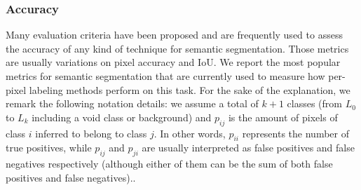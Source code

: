 \subsubsection{Accuracy}

Many evaluation criteria have been proposed and are frequently used to assess the accuracy of any kind of technique for semantic segmentation. Those metrics are usually variations on pixel accuracy and \ac{IoU}. We report the most popular metrics for semantic segmentation that are currently used to measure how per-pixel labeling methods perform on this task. For the sake of the explanation, we remark the following notation details: we assume a total of $k+1$ classes (from $L_0$ to $L_{k}$ including a void class or background) and $p_{ij}$ is the amount of pixels of class $i$ inferred to belong to class $j$. In other words, $p_{ii}$ represents the number of true positives, while $p_{ij}$ and $p_{ji}$ are usually interpreted as false positives and false negatives respectively (although either of them can be the sum of both false positives and false negatives)..

